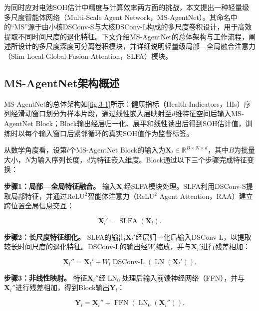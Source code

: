 为同时应对电池SOH估计中精度与计算效率两方面的挑战，本文提出一种轻量级多尺度智能体网络（Multi-Scale Agent Network，MS-AgentNet）。其命名中的“MS”源于由小核DSConv-S与大核DSConv-L构成的多尺度卷积设计，用于高效提取不同时间尺度的退化特征。下文介绍MS-AgentNet的总体架构与工作流程，阐述所设计的多尺度深度可分离卷积模块，并详细说明轻量级局部—全局融合注意力（Slim Local-Global Fusion Attention，SLFA）模块。

\subsection{MS-AgentNet架构概述}

MS-AgentNet的总体架构如\cref{fig:3-1}所示：健康指标（Health Indicators，HIs）序列经滑动窗口划分为样本片段，通过线性嵌入层映射至$d$维特征空间后输入MS-AgentNet Block；Block输出经层归一化、展平和线性读出后得到SOH估计值，训练时以每个输入窗口后紧邻循环的真实SOH值作为监督标签。

从数学角度看，设第$l$个MS-AgentNet Block的输入为$\mathbf X_l\in\mathbb R^{B\times N\times d}$，其中$B$为批量大小，$N$为输入序列长度，$d$为特征嵌入维度。Block通过以下三个步骤完成特征变换：

\textbf{步骤1：局部—全局特征融合。} 输入$\mathbf X_l$经SLFA模块处理。SLFA利用DSConv-S提取局部特征，并通过ReLU$^2$智能体注意力（ReLU$^2$ Agent Attention，RAA）建立跨位置全局信息交互：

\begin{equation}
\mathbf X_l'
=
\operatorname{SLFA}(\mathbf X_l).
\label{eq:block_slfa}
\end{equation}

\textbf{步骤2：长尺度特征细化。} SLFA的输出$\mathbf X_l'$经层归一化后输入DSConv-L，以提取较长时间尺度的退化特征。DSConv-L的输出经$W_l$缩放，并与$\mathbf X_l'$进行残差相加：

\begin{equation}
\mathbf X_l''
=
\mathbf X_l'
+
W_l
\operatorname{DSConv\text{-}L}
\left(
\operatorname{LN}(\mathbf X_l')
\right).
\label{eq:block_dsconv_l}
\end{equation}

\textbf{步骤3：非线性映射。} 特征$\mathbf X_l''$经$\operatorname{LN}_0$处理后输入前馈神经网络（FFN），并与$\mathbf X_l''$进行残差相加，得到Block输出$\mathbf Y_l$：

\begin{equation}
\mathbf Y_l
=
\mathbf X_l''+
\operatorname{FFN}
\left(
\operatorname{LN}_0(\mathbf X_l'')
\right).
\label{eq:block_ffn}
\end{equation}

